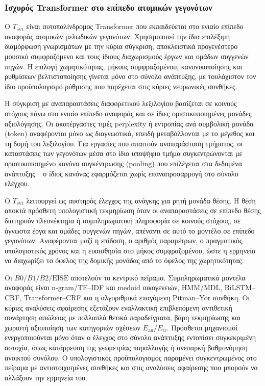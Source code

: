 \documentclass[11pt,a4paper]{article}
\begin{document}
\subsubsection{Ισχυρός Transformer στο επίπεδο ατομικών γεγονότων}\label{app:event-transformer}

Ο $T_{\mathrm{evt}}$ είναι αυτοπαλίνδρομος Transformer που εκπαιδεύεται στο ενιαίο επίπεδο αναφοράς ατομικών μελωδικών γεγονότων. Χρησιμοποιεί την ίδια επιλέξιμη διαμόρφωση γνωρισμάτων με την κύρια σύγκριση, αποκλειστικά προγενέστερο μουσικό συμφραζόμενο και τους ίδιους διαχωρισμούς έργων και ομάδων συγγενών πηγών. Η επιλογή χωρητικότητας, μήκους συμφραζομένου, κανονικοποίησης και ρυθμίσεων βελτιστοποίησης γίνεται μόνο στο σύνολο ανάπτυξης, με τουλάχιστον τον ίδιο προϋπολογισμό ρύθμισης που παρέχεται στις κύριες νευρωνικές συνθήκες.

Η σύγκριση με αναπαραστάσεις διαφορετικού λεξιλογίου βασίζεται σε κοινούς στόχους πάνω στο ενιαίο επίπεδο αναφοράς και σε ίδιες οριστικοποιημένες μονάδες αξιολόγησης. Οι ακατέργαστες τιμές perplexity ή εντροπίας ανά συμβολική μονάδα (token) αναφέρονται μόνο ως διαγνωστικά, επειδή μεταβάλλονται με το μέγεθος και τη δομή του λεξιλογίου. Για εργασίες που απαιτούν αναπαράσταση τμήματος, οι καταστάσεις των γεγονότων μέσα στο ίδιο υποψήφιο τμήμα συγκεντρώνονται με οριστικοποιημένο κανόνα συγκέντρωσης (pooling) που επιλέγεται στα δεδομένα ανάπτυξης· ο ίδιος κανόνας εφαρμόζεται χωρίς επαναπροσαρμογή στο σύνολο ελέγχου.

Ο $T_{\mathrm{evt}}$ λειτουργεί ως αυστηρός έλεγχος της ανάγκης για ρητή μονάδα θέσης. Η θέση αποκτά πρόσθετη υπολογιστική τεκμηρίωση όταν οι αναπαραστάσεις σε επίπεδο θέσης διατηρούν πλεονέκτημα ή συμπληρωματική πληροφορία σε κοινούς στόχους, σε άγνωστα έργα και ομάδες συγγενών πηγών, απέναντι σε αυτό το μοντέλο σε επίπεδο γεγονότων. Αναφέρονται μαζί η επίδοση, ο αριθμός παραμέτρων, ο πραγματικός υπολογιστικός χρόνος και η ευαισθησία στο μήκος συμφραζομένου, ώστε η ερμηνεία να διαχωρίζει το όφελος της δομικής μονάδας από το όφελος της χωρητικότητας.


Οι $B0/B1/B2/\mathrm{EISE}$ αποτελούν το κεντρικό πείραμα. Συμπληρωματικά μοντέλα αναφοράς είναι n-gram/TF--IDF και medoid οικογενειών, HMM/MDL, BiLSTM--CRF, Transformer--CRF και η αλγοριθμικά επαγόμενη Pitman--Yor συνθήκη. Οι κύριες αναλύσεις αφαίρεσης εξετάζουν εναλλακτική επιβλεπόμενη αντιθετική συνάρτηση απώλειας με πολλαπλά θετικά παραδείγματα, βάρη τεκμηρίωσης και χωριστή αξιοποίηση των κατηγοριών σχέσεων $E_{\mathrm{an}}/E_{\mathrm{tr}}$. Πρόσθετοι μηχανισμοί ενεργοποιούνται μόνο όταν ο έλεγχος στο σύνολο ανάπτυξης εντοπίσει συγκεκριμένη αστοχία, όπως κατάρρευση της γεωμετρίας παραλλαγής ή ανεπαρκή βαθμονόμηση ανοικτού συνόλου. Ο υπολογιστικός προϋπολογισμός παραμένει συγκεντρωμένος στο πείραμα με αντιστοιχισμένες συνθήκες και στις αναλύσεις αφαίρεσης που μπορούν να αλλάξουν την ερμηνεία του.
\end{document}

